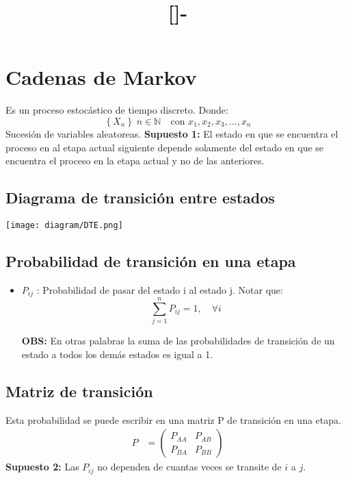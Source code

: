 \documentclass{templateNote}
\begin{document}

\title{[\asignatura]-\titulo}
\author{
    \autor
}
\portada
\margenes %

\section{Cadenas de Markov}
Es un proceso estoc\'astico de tiempo discreto. Donde:
\begin{equation*}
    \left\{X_n\right\} \; n \in \mathbb{N} \quad \text{con } x_1, x_2, x_3, ..., x_n
\end{equation*}
Sucesi\'on de variables aleatoreas. \newline
\textbf{Supuesto 1:}
El estado en que se encuentra el proceso en al etapa actual siguiente depende solamente del estado en que se encuentra el proceso en la etapa actual y no de las anteriores.
\subsection{Diagrama de transici\'on entre estados}
\begin{center}
    \texttt{[image: diagram/DTE.png]}
\end{center}
\subsection{Probabilidad de transici\'on en una etapa}
\begin{itemize}
    \item $P_{ij}$ : Probabilidad de pasar del estado i al estado j.
    Notar que:
    \begin{equation*}
        \sum_{j=1}^{n}{P_{ij}} = 1, \quad \forall i
    \end{equation*}

    \textbf{OBS:} En otras palabras la suma de las probabilidades de transici\'on de un estado a todos los dem\'as estados es igual a 1.
\end{itemize}
\subsection{Matriz de transici\'on}
Esta probabilidad se puede escribir en una matriz P de transici\'on en una etapa.
\begin{align*}
    P &= \left(\begin{matrix}
        P_{AA} & P_{AB} \\
        P_{BA} & P_{BB}
    \end{matrix} \right)
\end{align*}
\textbf{Supuesto 2:}
Las $P_{ij}$ no dependen de cuantas veces se transite de $i$ a $j$.
\end{document}

